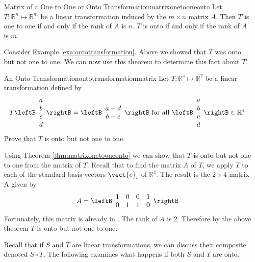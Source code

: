 \begin{theorem}{Matrix of a One to One or Onto Transformation}{matrixonetooneonto}
Let $T: \mathbb{R}^n \mapsto \mathbb{R}^m$ be a linear transformation induced by the $m \times n$ matrix $A$. Then $T$ is one to one if and only if the rank of $A$ is $n$. $T$ is onto if and only if the rank of $A$ is $m$. 
\end{theorem}

Consider Example \ref{exa:ontotransformation}. Above we showed that $T$ was onto but not one to one. We can now use this theorem to determine this fact about $T$. 

\begin{example}{An Onto Transformation}{ontotransformationmatrix}
Let $T: \mathbb{R}^4 \mapsto \mathbb{R}^2$ be a linear transformation defined by
\[
T \leftB \begin{array}{c}
a \\
b \\
c \\
d
\end{array}
\rightB = 
\leftB \begin{array}{c}
a + d \\
b + c 
\end{array}
\rightB
\mbox{ for all } \leftB \begin{array}{c}
a \\
b \\
c \\
d
\end{array}
\rightB \in \mathbb{R}^4
\]
Prove that $T$ is onto but not one to one.
\end{example}

\begin{solution}
Using Theorem \ref{thm:matrixonetooneonto} we can show that $T$ is onto but not one to one from the matrix of $T$. Recall that to find the matrix $A$ of $T$, we apply $T$ to each of the standard basis vectors $\vect{e}_i$ of $\mathbb{R}^4$. The result is the $2 \times 4$ matrix A given by 
\[
A = \leftB \begin{array}{rrrr}
1 & 0 & 0 & 1 \\
0 & 1 & 1 & 0 
\end{array} \rightB
\]
Fortunately, this matrix is already in {\rref}. The rank of $A$ is $2$. Therefore by the above theorem $T$ is onto but not one to one. 
\end{solution}

Recall that if $S$ and $T$ are linear transformations, we can discuss their composite denoted $S \circ T$. The following examines what happens if both $S$ and $T$ are onto. 

